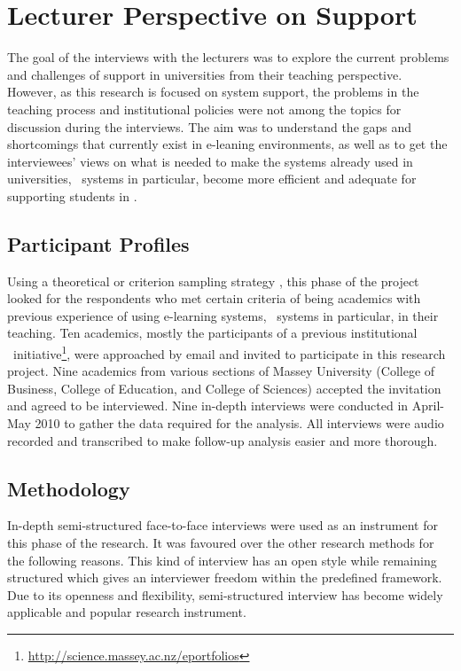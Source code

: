 \section{Lecturer Perspective on \LLLc Support}

The goal of the interviews with the lecturers was to explore the current
problems and challenges of \LLLs support in universities from their teaching
perspective. However, as this research is focused on system support, the
problems in the teaching process and institutional policies were not among the
topics for discussion during the interviews. The aim was to understand the gaps
and shortcomings that currently exist in e-leaning environments, as well as to
get the interviewees' views on what is needed to make the systems already used
in universities, \ep~systems in particular, become more efficient and adequate
for supporting students in \LLLsn. 

\subsection{Participant Profiles}
Using a theoretical or criterion sampling strategy \citep{Byrne2001,
Warren2001}, this phase of the project looked for the respondents who met
certain criteria of being academics with previous experience of using
e-learning systems, \ep~systems in particular, in their teaching. Ten academics,
mostly the participants of a previous institutional
\ep~initiative\footnote{\url{http://science.massey.ac.nz/eportfolios}}, were
approached by email and invited to participate in this research project. Nine
academics from various sections of Massey University (College of Business,
College of Education, and College of Sciences) accepted the invitation and
agreed to be interviewed. Nine in-depth interviews were conducted in April-May
2010 to gather the data required for the analysis. All interviews were audio
recorded and transcribed to make follow-up analysis easier and more thorough.

\subsection{Methodology}

In-depth semi-structured face-to-face interviews were used as an instrument for
this phase of the research. It was favoured over the other research methods for
the following reasons. This kind of interview has an open style while remaining
structured \citep{Gillham2000} which gives an interviewer freedom within the
predefined framework. Due to its openness and flexibility, semi-structured
interview has become widely applicable and popular research instrument.

